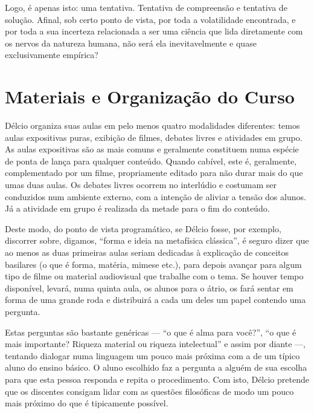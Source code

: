 \documentclass[12pt,a4paper]{article}
\begin{document}
	Logo, é apenas isto: uma tentativa. Tentativa de compreensão e 
	tentativa de solução. Afinal, sob certo ponto de vista, por toda a 
	volatilidade encontrada, e por toda a sua incerteza relacionada a 
	ser uma ciência que lida diretamente com os nervos da natureza 
	humana, não será ela inevitavelmente e quase exclusivamente empírica? 
	
	
	\newpage
	
	\section{Materiais e Organização do Curso}
	
    Délcio organiza suas aulas em pelo menos quatro modalidades diferentes: 
    temos aulas expositivas puras, exibição de filmes, debates livres e 
    atividades em grupo. As aulas expositivas são as mais comuns e geralmente 
    constituem numa espécie de ponta de lança para qualquer conteúdo. Quando 
    cabível, este é, geralmente, complementado por um filme, propriamente 
    editado para não durar mais do que umas duas aulas. Os debates livres 
    ocorrem no interlúdio e costumam ser conduzidos num ambiente externo, com 
    a intenção de aliviar a tensão dos alunos. Já a atividade em grupo é 
    realizada da metade para o fim do conteúdo. 
    
    Deste modo, do ponto de vista programático, se Délcio fosse, por exemplo, 
    discorrer sobre, digamos, ``forma e ideia na metafísica clássica'', 
    é seguro dizer que ao menos as duas primeiras aulas seriam dedicadas à 
    explicação de conceitos basilares (o que é forma, matéria, mimese etc.), 
    para depois avançar para algum tipo de filme ou material audiovisual 
    que trabalhe com o tema. Se houver tempo disponível, levará, numa quinta 
    aula, os alunos para o átrio, os fará sentar em forma de uma grande roda 
    e distribuirá a cada um deles um papel contendo uma pergunta. 
    
    Estas perguntas são bastante genéricas --- ``o que é alma para você?'', 
    ``o que é mais importante? Riqueza material ou riqueza intelectual'' e 
    assim por diante ---, tentando dialogar numa linguagem um pouco mais 
    próxima com a de um típico aluno do ensino básico. O aluno escolhido faz 
    a pergunta a alguém de sua escolha para que esta pessoa responda e repita 
    o procedimento. Com isto, Délcio pretende que os discentes consigam lidar 
    com as questões filosóficas de modo um pouco mais próximo do que 
    é tipicamente possível. 
    
\end{document}
